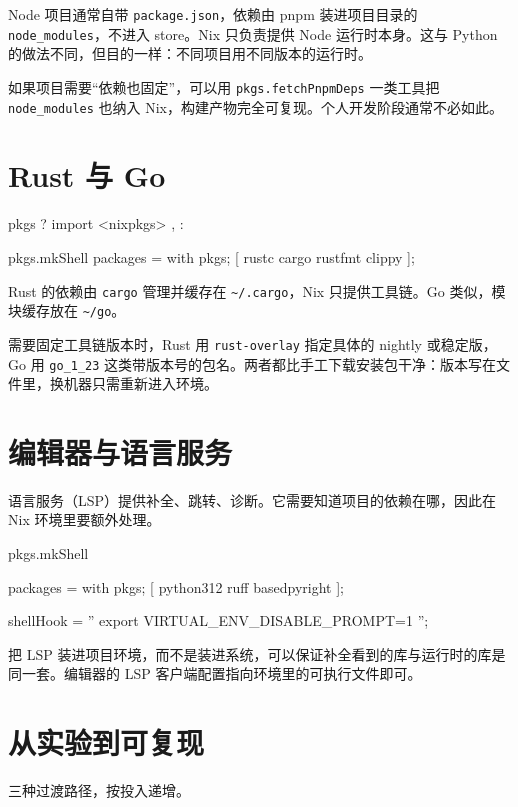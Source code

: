 Node 项目通常自带 \texttt{package.json}，依赖由 pnpm 装进项目目录的 \texttt{node\_\allowbreak{}modules}，不进入 store。Nix 只负责提供 Node 运行时本身。这与 Python 的做法不同，但目的一样：不同项目用不同版本的运行时。

如果项目需要“依赖也固定”，可以用 \texttt{pkgs.\allowbreak{}fetchPnpmDeps} 一类工具把 \texttt{node\_\allowbreak{}modules} 也纳入 Nix，构建产物完全可复现。个人开发阶段通常不必如此。

\section{Rust 与 Go}

\begin{nixcode}
{
  pkgs ? import <nixpkgs> { },
}:

pkgs.mkShell {
  packages = with pkgs; [
    rustc
    cargo
    rustfmt
    clippy
  ];
}
\end{nixcode}

Rust 的依赖由 \texttt{cargo} 管理并缓存在 \texttt{\textasciitilde/.cargo}，Nix 只提供工具链。Go 类似，模块缓存放在 \texttt{\textasciitilde/go}。

需要固定工具链版本时，Rust 用 \texttt{rust-overlay} 指定具体的 nightly 或稳定版，Go 用 \texttt{go\_1\_23} 这类带版本号的包名。两者都比手工下载安装包干净：版本写在文件里，换机器只需重新进入环境。

\section{编辑器与语言服务}

语言服务（LSP）提供补全、跳转、诊断。它需要知道项目的依赖在哪，因此在 Nix 环境里要额外处理。

\begin{nixcode}
pkgs.mkShell {
  packages = with pkgs; [
    python312
    ruff
    basedpyright
  ];

  shellHook = ''
    export VIRTUAL_ENV_DISABLE_PROMPT=1
  '';
}
\end{nixcode}

把 LSP 装进项目环境，而不是装进系统，可以保证补全看到的库与运行时的库是同一套。编辑器的 LSP 客户端配置指向环境里的可执行文件即可。

\section{从实验到可复现}

三种过渡路径，按投入递增。

